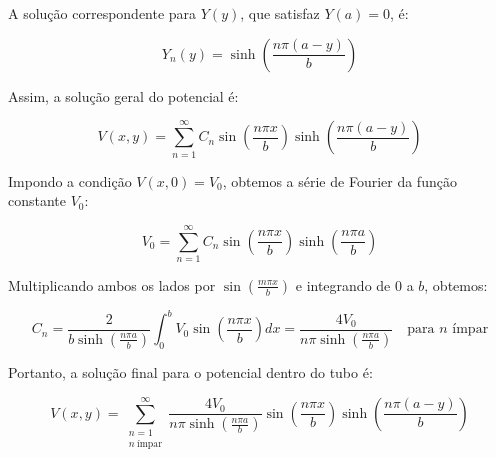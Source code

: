 \documentclass[a4paper,12pt]{article}
\begin{document}
\begin{flushleft}
A solução correspondente para \( Y(y) \), que satisfaz \( Y(a) = 0 \), é:

\begin{equation}
Y_n(y) = \sinh\left( \frac{n\pi (a - y)}{b} \right)
\end{equation}

Assim, a solução geral do potencial é:

\begin{equation}
\boxed{
V(x, y) = \sum_{n=1}^{\infty} C_n \sin\left( \frac{n\pi x}{b} \right) \sinh\left( \frac{n\pi (a - y)}{b} \right)}
\end{equation}

Impondo a condição \( V(x, 0) = V_0 \), obtemos a série de Fourier da função constante \( V_0 \):

\begin{equation}
V_0 = \sum_{n=1}^{\infty} C_n \sin\left( \frac{n\pi x}{b} \right) \sinh\left( \frac{n\pi a}{b} \right)
\end{equation}

Multiplicando ambos os lados por \( \sin\left( \frac{m\pi x}{b} \right) \) e integrando de \( 0 \) a \( b \), obtemos:

\begin{equation}
C_n = \frac{2}{b \sinh\left( \frac{n\pi a}{b} \right)} \int_0^b V_0 \sin\left( \frac{n\pi x}{b} \right) dx = \frac{4V_0}{n\pi \sinh\left( \frac{n\pi a}{b} \right)} \quad \text{para } n \text{ ímpar}
\end{equation}

Portanto, a solução final para o potencial dentro do tubo é:

\begin{equation}
\boxed{
V(x, y) = \sum_{\substack{n=1 \\ n\ \text{ímpar}}}^{\infty} \frac{4V_0}{n\pi \sinh\left( \frac{n\pi a}{b} \right)} \sin\left( \frac{n\pi x}{b} \right) \sinh\left( \frac{n\pi (a - y)}{b} \right)
}
\end{equation}
\end{flushleft}
\end{document}
